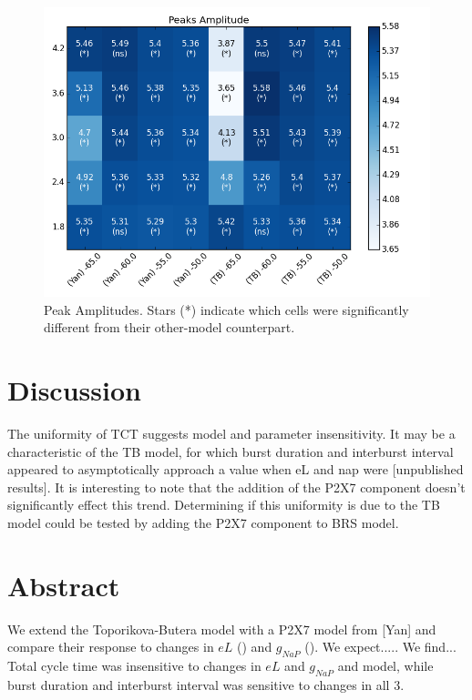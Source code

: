 \documentclass[11pt]{article}
\begin{document}
\begin{figure}[h]
	\centering
	\includegraphics[scale=.4]{heatmap_Peaks_Amplitude.png}
	\caption{Peak Amplitudes. Stars (*) indicate  which cells were significantly different from their other-model counterpart.}
	\label{fig:hmPA}

\end{figure}


%
\FloatBarrier
\section{Discussion}

The uniformity of TCT suggests model and parameter insensitivity. It may be a characteristic of the TB model, for which burst duration and interburst interval appeared to asymptotically approach a value when eL and nap were [unpublished results]. It is interesting to note that the addition of the P2X7 component doesn't significantly effect this trend. Determining if this uniformity is due to the TB model could be tested by adding the P2X7 component to BRS model.





 
 
 \section{Abstract}
We extend the Toporikova-Butera model with a P2X7 model from [Yan] and compare their response to changes in $eL$ () and $g_{NaP}$ ().
We expect.....
We find...
Total cycle time was insensitive to changes in $eL$ and $g_{NaP}$ and model, while burst duration and interburst interval was sensitive to changes in all 3.
 
\end{document}
